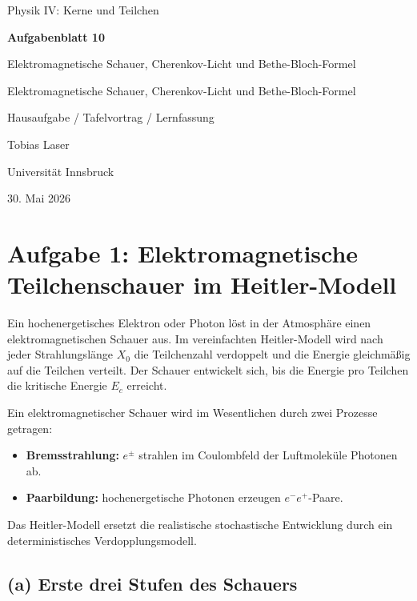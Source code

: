 \documentclass[11pt,a4paper]{scrartcl}
\newcommand{\CourseTitle}{COURSE NAME}
\newcommand{\DocumentKind}{DOCUMENT KIND}
\newcommand{\DocumentTitle}{DOCUMENT TITLE}
\newcommand{\DocumentSubtitle}{}
\newcommand{\AuthorName}{YOUR NAME}
\newcommand{\InstitutionName}{INSTITUTION NAME}
\newcommand{\SubmissionDate}{\today}
\newcommand{\makeuniversitytitle}{%
    \begin{titlepage}
        \centering
        \vspace*{2cm}
        {\Large \CourseTitle\par}
        \vspace{1.2cm}
        {\huge\bfseries \DocumentTitle\par}
        \ifx\DocumentSubtitle\empty\else
            \vspace{0.4cm}
            {\Large \DocumentSubtitle\par}
        \fi
        \vspace{1cm}
        {\Large \DocumentKind\par}
        \vfill
        {\large \AuthorName\par}
        \vspace{0.2cm}
        {\large \InstitutionName\par}
        \vspace{0.8cm}
        {\large \SubmissionDate\par}
    \end{titlepage}
    \pagenumbering{arabic}
}
\renewcommand{\CourseTitle}{Physik IV: Kerne und Teilchen}
\renewcommand{\DocumentKind}{Hausaufgabe / Tafelvortrag / Lernfassung}
\renewcommand{\DocumentTitle}{Aufgabenblatt 10}
\renewcommand{\DocumentSubtitle}{Elektromagnetische Schauer, Cherenkov-Licht und Bethe-Bloch-Formel}
\renewcommand{\AuthorName}{Tobias Laser}
\renewcommand{\InstitutionName}{Universit\"at Innsbruck}
\renewcommand{\SubmissionDate}{30. Mai 2026}
\theoremstyle{definition}
\theoremstyle{plain}
\theoremstyle{remark}
\begin{document}
\makeuniversitytitle
\tableofcontents
\newpage

\section{Aufgabe 1: Elektromagnetische Teilchenschauer im Heitler-Modell}

\begin{taskbox}
Ein hochenergetisches Elektron oder Photon l\"ost in der Atmosph\"are einen elektromagnetischen Schauer aus. Im vereinfachten Heitler-Modell wird nach jeder Strahlungsl\"ange $X_0$ die Teilchenzahl verdoppelt und die Energie gleichm\"a\ss{}ig auf die Teilchen verteilt. Der Schauer entwickelt sich, bis die Energie pro Teilchen die kritische Energie $E_c$ erreicht.
\end{taskbox}

\begin{definitionbox}[title=Physikalische Idee]
Ein elektromagnetischer Schauer wird im Wesentlichen durch zwei Prozesse getragen:
\begin{itemize}
    \item \textbf{Bremsstrahlung:} $e^{\pm}$ strahlen im Coulombfeld der Luftmolek\"ule Photonen ab.
    \item \textbf{Paarbildung:} hochenergetische Photonen erzeugen $e^-e^+$-Paare.
\end{itemize}
Das Heitler-Modell ersetzt die realistische stochastische Entwicklung durch ein deterministisches Verdopplungsmodell.
\end{definitionbox}

\subsection*{(a) Erste drei Stufen des Schauers}
\end{document}
